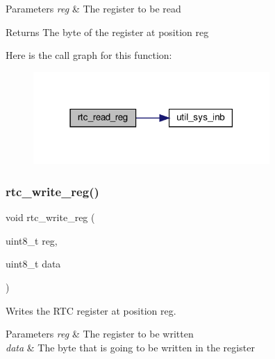 \begin{DoxyParams}{Parameters}
{\em reg} & The register to be read \\
\hline
\end{DoxyParams}
\begin{DoxyReturn}{Returns}
The byte of the register at position reg 
\end{DoxyReturn}
Here is the call graph for this function\+:\nopagebreak
\begin{figure}[H]
\begin{center}
\leavevmode
\includegraphics[width=255pt]{group__rtc_ga967406c372c2ba0b6b18c4784d5b1ce2_cgraph}
\end{center}
\end{figure}
\mbox{\label{group__rtc_ga9d32737436e666dcd33816dd240321a8}} 
\subsubsection{\texorpdfstring{rtc\+\_\+write\+\_\+reg()}{rtc\_write\_reg()}}
{\footnotesize\ttfamily void rtc\+\_\+write\+\_\+reg (\begin{DoxyParamCaption}\item[{uint8\+\_\+t}]{reg,  }\item[{uint8\+\_\+t}]{data }\end{DoxyParamCaption})}



Writes the R\+TC register at position reg. 


\begin{DoxyParams}{Parameters}
{\em reg} & The register to be written \\
\hline
{\em data} & The byte that is going to be written in the register \\
\hline
\end{DoxyParams}
